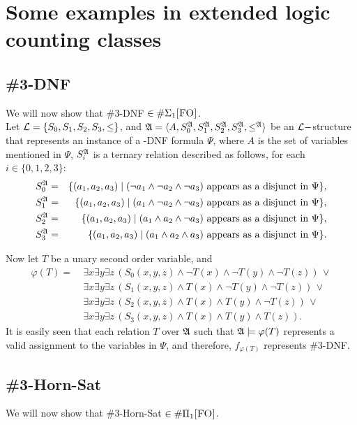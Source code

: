 \section{Some examples in extended logic counting classes}

\subsection{{\sc \#3-DNF}}
We will now show that {\sc \#3-DNF} $\in\#\Sigma_{1}\textsc{[FO]}$.\\

Let ${\cal L} = \{S_0,S_1,S_2,S_3,\leq\}$, and ${\frak A} = \langle A, S_0^{\frak A}, S_1^{\frak A}, S_2^{\frak A}, S_3^{\frak A}, \leq^{\frak A} \rangle$ be an ${\cal L}-$structure that represents an instance of a {-DNF} formula $\Psi$, where $A$ is the set of variables mentioned in $\Psi$, $S_i^{\frak A}$ is a ternary relation described as follows, for each $i\in\{0,1,2,3\}$:
\begin{eqnarray*}
S_0^{\frak A} &=& \{(a_1,a_2,a_3)\mid (\neg a_1 \wedge \neg a_2 \wedge \neg a_3) \mbox{ appears as a disjunct in }\Psi\},\\
S_1^{\frak A} &=& \{(a_1,a_2,a_3)\mid ( a_1 \wedge \neg a_2 \wedge \neg a_3) \mbox{ appears as a disjunct in }\Psi\},\\
S_2^{\frak A} &=& \{(a_1,a_2,a_3)\mid ( a_1 \wedge  a_2 \wedge \neg a_3) \mbox{ appears as a disjunct in }\Psi\},\\
S_3^{\frak A} &=& \{(a_1,a_2,a_3)\mid ( a_1 \wedge  a_2 \wedge  a_3) \mbox{ appears as a disjunct in }\Psi\}.
\end{eqnarray*}

Now let $T$ be a unary second order variable, and
\begin{align*}
\varphi(T) =\ &\exists x \exists y \exists z \,(S_0(x,y,z) \wedge \neg T(x) \wedge \neg T(y) \wedge \neg T(z))\,\vee \\
&\exists x \exists y \exists z \,(S_1(x,y,z) \wedge T(x) \wedge \neg T(y) \wedge \neg T(z))\,\vee \\
&\exists x \exists y \exists z \,(S_2(x,y,z) \wedge T(x) \wedge T(y) \wedge \neg T(z))\,\vee \\
&\exists x \exists y \exists z \,(S_3(x,y,z) \wedge T(x) \wedge T(y) \wedge T(z)).
\end{align*}
It is easily seen that each relation $T$ over ${\frak A}$ such that ${\frak A}\models\varphi(T)$ represents a valid assignment to the variables in $\Psi$, and therefore, $f_{\varphi(T)}$ represents {\sc \#3-DNF}.

\subsection{{\sc \#3-Horn-Sat}}
We will now show that {\sc \#3-Horn-Sat} $\in\#\Pi_{1}\textsc{[FO]}$.\\

